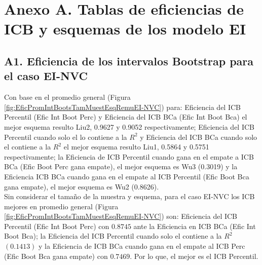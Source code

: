 \section*{Anexo A. Tablas de eficiencias de ICB y esquemas de los modelo EI}

\subsection*{A1. Eficiencia de los intervalos Bootstrap para el caso EI-NVC}

Con base en el promedio general (Figura \ref{fig:EficPromIntBootsTamMuestEsqRemuEI-NVC}) para: Eficiencia del ICB Percentil (Efic Int Boot Perc) y Eficiencia del ICB BCa (Efic Int Boot Bca) el mejor esquema resulto Liu2, 0.9627 y 0.9052 respectivamente;
Eficiencia del ICB Percentil cuando solo el lo contiene a la $R^{2}$ y Eficiencia del ICB BCa cuando solo el contiene a la $R^{2}$ el mejor esquema resulto Liu1, 0.5864 y 0.5751 respectivamente; 
la Eficiencia de ICB Percentil cuando gana en el empate a ICB BCa (Efic Boot Perc gana empate), el mejor esquema es Wu3 (0.3019) y la Eficiencia ICB BCa cuando gana en el empate al ICB Percentil (Efic Boot Bca gana empate), el mejor esquema es Wu2 (0.8626).\\


Sin considerar el tamaño de la muestra y esquema, para el caso EI-NVC los ICB mejores en promedio general (Figura \ref{fig:EficPromIntBootsTamMuestEsqRemuEI-NVC}) son: Eficiencia del ICB Percentil (Efic Int Boot Perc) con $0.8745$ ante la Eficiencia en ICB BCa (Efic Int Boot Bca); la Eficiencia del ICB Percentil cuando solo el contiene a la $R^{2}$ $(0.1413)$ y la Eficiencia de ICB BCa cuando gana en el empate al ICB Perc (Efic Boot Bca gana empate) con $0.7469$. Por lo que, el mejor es el ICB Percentil.


